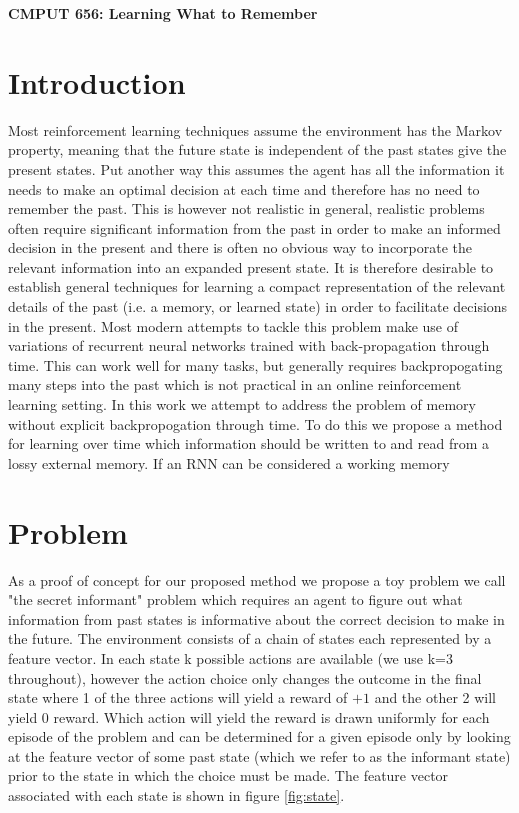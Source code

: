 \documentclass{article}
\begin{document}
\begin{center}
{\Large \textbf{CMPUT 656: Learning What to Remember}}
\end{center}
\section*{Introduction}
Most reinforcement learning techniques assume the environment has the Markov property, meaning that the future state is independent of the past states give the present states. Put another way this assumes the agent has all the information it needs to make an optimal decision at each time and therefore has no need to remember the past. This is however not realistic in general, realistic problems often require significant information from the past in order to make an informed decision in the present and there is often no obvious way to incorporate the relevant information into an expanded present state. It is therefore desirable to establish general techniques for learning a compact representation of the relevant details of the past (i.e. a memory, or learned state) in order to facilitate decisions in the present.
Most modern attempts to tackle this problem make use of variations of recurrent neural networks trained with back-propagation through time. This can work well for many tasks, but generally requires backpropogating many steps into the past which is not practical in an online reinforcement learning setting. In this work we attempt to address the problem of memory without explicit backpropogation through time. To do this we propose a method for learning over time which information should be written to and read from a lossy external memory. If an RNN can be considered a working memory

\section*{Problem}
As a proof of concept for our proposed method we propose a toy problem we call "the secret informant" problem which requires an agent to figure out what information from past states is informative about the correct decision to make in the future. The environment consists of a chain of states each represented by a feature vector. In each state k possible actions are available (we use k=3 throughout), however the action choice only changes the outcome in the final state where 1 of the three actions will yield a reward of $+1$ and the other 2 will yield $0$ reward. Which action will yield the reward is drawn uniformly for each episode of the problem and can be determined for a given episode only by looking at the feature vector of some past state (which we refer to as the informant state) prior to the state in which the choice must be made. The feature vector associated with each state is shown in figure \ref{fig:state}.
\end{document}

